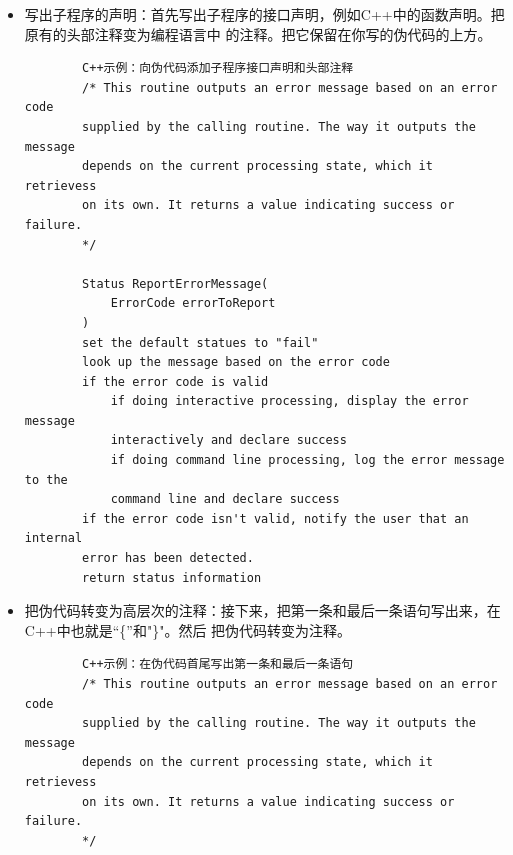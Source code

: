 \documentclass{article}
\begin{document}
\begin{itemize}
    \item 写出子程序的声明：首先写出子程序的接口声明，例如C++中的函数声明。把原有的头部注释变为编程语言中
    的注释。把它保留在你写的伪代码的上方。
    \begin{lstlisting}
        C++示例：向伪代码添加子程序接口声明和头部注释
        /* This routine outputs an error message based on an error code 
        supplied by the calling routine. The way it outputs the message 
        depends on the current processing state, which it retrievess
        on its own. It returns a value indicating success or failure.
        */

        Status ReportErrorMessage(
            ErrorCode errorToReport
        )
        set the default statues to "fail"
        look up the message based on the error code
        if the error code is valid
            if doing interactive processing, display the error message
            interactively and declare success
            if doing command line processing, log the error message to the 
            command line and declare success
        if the error code isn't valid, notify the user that an internal 
        error has been detected.
        return status information
    \end{lstlisting}
    \item 把伪代码转变为高层次的注释：接下来，把第一条和最后一条语句写出来，在C++中也就是“\{”和"\}"。然后
    把伪代码转变为注释。
    \begin{lstlisting}
        C++示例：在伪代码首尾写出第一条和最后一条语句
        /* This routine outputs an error message based on an error code 
        supplied by the calling routine. The way it outputs the message 
        depends on the current processing state, which it retrievess
        on its own. It returns a value indicating success or failure.
        */


\end{lstlisting}
\end{itemize}
\end{document}
